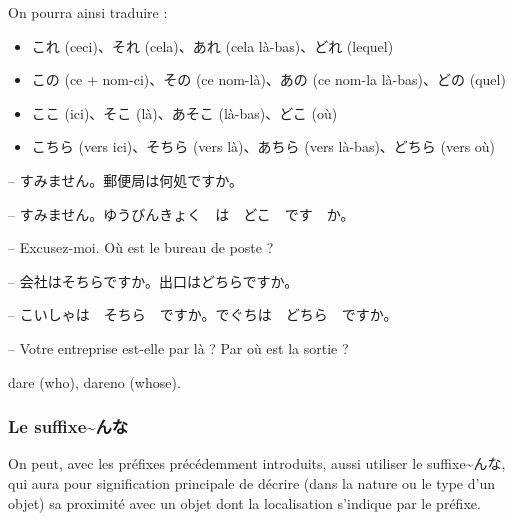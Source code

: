     On pourra ainsi traduire : 
    \begin{itemize}
        \item これ (ceci)、それ (cela)、あれ (cela là-bas)、どれ (lequel)
        \item この (ce + nom-ci)、その (ce nom-là)、あの (ce nom-la là-bas)、どの (quel)
        \item ここ (ici)、そこ (là)、\textcolor{couleurmatiere}{あそこ} (là-bas)、どこ (où)
        \item こちら (vers ici)、そちら (vers là)、あちら (vers là-bas)、どちら (vers où)
    \end{itemize}

    \begin{tcolorbox}
        -- すみません。郵便局は何処ですか。

        -- すみません。ゆうびんきょく　は　どこ　です　か。

        -- Excusez-moi. Où est le bureau de poste ?
    \end{tcolorbox}

    \begin{tcolorbox}
        -- 会社はそちらですか。出口はどちらですか。

        -- こいしゃは　そちら　ですか。でぐちは　どちら　ですか。

        -- Votre entreprise est-elle par là ? Par où est la sortie ?
    \end{tcolorbox}

    
    dare (who), dareno (whose).

        \subsubsection{Le suffixe\~{}んな}

    On peut, avec les préfixes précédemment introduits, aussi utiliser le suffixe\~{}んな, qui aura pour signification principale de décrire (dans la nature ou le type d'un objet) sa proximité avec un objet dont la localisation s'indique par le préfixe.

